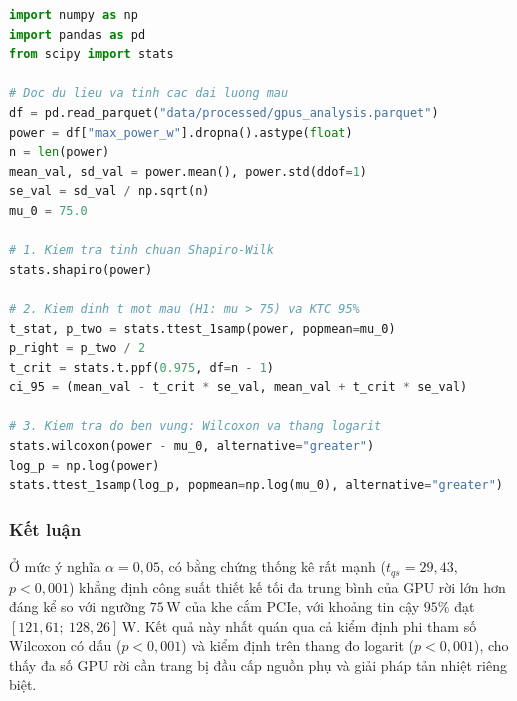 \begin{lstlisting}[language=Python]
import numpy as np
import pandas as pd
from scipy import stats

# Doc du lieu va tinh cac dai luong mau
df = pd.read_parquet("data/processed/gpus_analysis.parquet")
power = df["max_power_w"].dropna().astype(float)
n = len(power)
mean_val, sd_val = power.mean(), power.std(ddof=1)
se_val = sd_val / np.sqrt(n)
mu_0 = 75.0

# 1. Kiem tra tinh chuan Shapiro-Wilk
stats.shapiro(power)

# 2. Kiem dinh t mot mau (H1: mu > 75) va KTC 95%
t_stat, p_two = stats.ttest_1samp(power, popmean=mu_0)
p_right = p_two / 2
t_crit = stats.t.ppf(0.975, df=n - 1)
ci_95 = (mean_val - t_crit * se_val, mean_val + t_crit * se_val)

# 3. Kiem tra do ben vung: Wilcoxon va thang logarit
stats.wilcoxon(power - mu_0, alternative="greater")
log_p = np.log(power)
stats.ttest_1samp(log_p, popmean=np.log(mu_0), alternative="greater")
\end{lstlisting}

\begin{table}[H]
  \centering
  \small
  \caption{Tổng hợp kết quả kiểm định trung bình một mẫu cho \texttt{max\_power\_w} (so với ngưỡng $75$\,W).}
  \label{tab:one_sample_summary}
  \renewcommand{\arraystretch}{1.25}
\end{table}

\subsubsection{Kết luận}

Ở mức ý nghĩa $\alpha = 0{,}05$, có bằng chứng thống kê rất mạnh ($t_{qs} = 29{,}43$, $p < 0{,}001$) khẳng định công suất thiết kế tối đa trung bình của GPU rời lớn hơn đáng kể so với ngưỡng $75$\,W của khe cắm PCIe, với khoảng tin cậy $95\%$ đạt $[121{,}61;\ 128{,}26]$\,W. Kết quả này nhất quán qua cả kiểm định phi tham số Wilcoxon có dấu ($p < 0{,}001$) và kiểm định trên thang đo logarit ($p < 0{,}001$), cho thấy đa số GPU rời cần trang bị đầu cấp nguồn phụ và giải pháp tản nhiệt riêng biệt.
